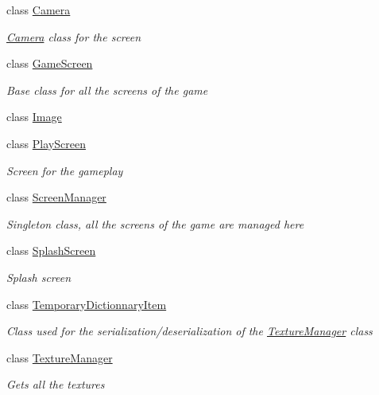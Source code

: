 \begin{DoxyCompactItemize}
\item 
class \hyperlink{class_hel_project_1_1_u_i_1_1_camera}{Camera}
\begin{DoxyCompactList}\small\item\em \hyperlink{class_hel_project_1_1_u_i_1_1_camera}{Camera} class for the screen \end{DoxyCompactList}\item 
class \hyperlink{class_hel_project_1_1_u_i_1_1_game_screen}{Game\+Screen}
\begin{DoxyCompactList}\small\item\em Base class for all the screens of the game \end{DoxyCompactList}\item 
class \hyperlink{class_hel_project_1_1_u_i_1_1_image}{Image}
\item 
class \hyperlink{class_hel_project_1_1_u_i_1_1_play_screen}{Play\+Screen}
\begin{DoxyCompactList}\small\item\em Screen for the gameplay \end{DoxyCompactList}\item 
class \hyperlink{class_hel_project_1_1_u_i_1_1_screen_manager}{Screen\+Manager}
\begin{DoxyCompactList}\small\item\em Singleton class, all the screens of the game are managed here \end{DoxyCompactList}\item 
class \hyperlink{class_hel_project_1_1_u_i_1_1_splash_screen}{Splash\+Screen}
\begin{DoxyCompactList}\small\item\em Splash screen \end{DoxyCompactList}\item 
class \hyperlink{class_hel_project_1_1_u_i_1_1_temporary_dictionnary_item}{Temporary\+Dictionnary\+Item}
\begin{DoxyCompactList}\small\item\em Class used for the serialization/deserialization of the \hyperlink{class_hel_project_1_1_u_i_1_1_texture_manager}{Texture\+Manager} class \end{DoxyCompactList}\item 
class \hyperlink{class_hel_project_1_1_u_i_1_1_texture_manager}{Texture\+Manager}
\begin{DoxyCompactList}\small\item\em Gets all the textures \end{DoxyCompactList}\end{DoxyCompactItemize}
